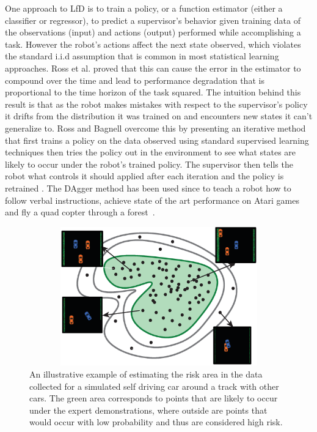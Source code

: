 \documentclass[10pt, conference]{ieeeconf}      %
\begin{document}
One approach to LfD is to train a policy, or a  function estimator (either a classifier or regressor), to predict a supervisor's behavior given training data of the  observations (input) and actions (output) performed while accomplishing a task. However the robot's actions affect the next state observed, which violates the standard i.i.d assumption that is common in most statistical learning approaches. Ross et al. proved that this can cause the error in the estimator to compound over the time and lead to performance degradation that is proportional to the time horizon of the task squared. The intuition behind this result is that as the robot makes mistakes with respect to the supervisor's policy it drifts from the distribution it was trained on and encounters new states it can't generalize to.  Ross and Bagnell overcome this by presenting an iterative method that first trains a policy on the data observed using standard supervised learning techniques then tries the policy out in the environment to see what states are likely to occur under the robot's trained policy.  The supervisor then tells the robot what controls it should applied after each iteration and the policy is retrained \cite{ross2010reduction}. The DAgger method has been used since to teach a robot how to follow verbal instructions, achieve state of the art performance on Atari games and fly a quad copter through a forest~\cite{NIPS2014_5421,duvallet2013imitation,ross2013learning}.




\begin{figure}[t!]
\centering
\includegraphics[width=12cm, height=6cm]{figures/teaser.eps}
\caption{ An illustrative example of estimating the risk area in the data collected for a simulated self driving car around a track with other cars. The green area corresponds to points that are likely to occur under the expert demonstrations, where outside are points that would occur with low probability and thus are considered high risk. } 
\vspace*{-10pt}
\label{fig:dis_traveled}
\end{figure}
\end{document}
